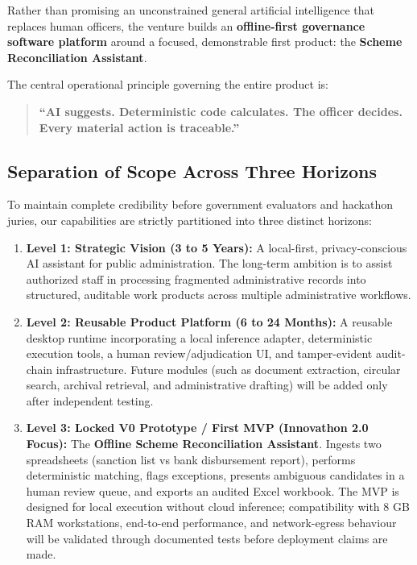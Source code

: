 \documentclass[11pt,a4paper]{article}
\begin{document}
Rather than promising an unconstrained general artificial intelligence that replaces human officers, the venture builds an \textbf{offline-first governance software platform} around a focused, demonstrable first product: the \textbf{Scheme Reconciliation Assistant}.

The central operational principle governing the entire product is:
\begin{quote}
    \textbf{“AI suggests. Deterministic code calculates. The officer decides. Every material action is traceable.”}
\end{quote}

\subsection{Separation of Scope Across Three Horizons}
To maintain complete credibility before government evaluators and hackathon juries, our capabilities are strictly partitioned into three distinct horizons:
\begin{enumerate}
    \item \textbf{Level 1: Strategic Vision (3 to 5 Years):} A local-first, privacy-conscious AI assistant for public administration. The long-term ambition is to assist authorized staff in processing fragmented administrative records into structured, auditable work products across multiple administrative workflows.
    \item \textbf{Level 2: Reusable Product Platform (6 to 24 Months):} A reusable desktop runtime incorporating a local inference adapter, deterministic execution tools, a human review/adjudication UI, and tamper-evident audit-chain infrastructure. Future modules (such as document extraction, circular search, archival retrieval, and administrative drafting) will be added only after independent testing.
    \item \textbf{Level 3: Locked V0 Prototype / First MVP (Innovathon 2.0 Focus):} The \textbf{Offline Scheme Reconciliation Assistant}. Ingests two spreadsheets (sanction list vs bank disbursement report), performs deterministic matching, flags exceptions, presents ambiguous candidates in a human review queue, and exports an audited Excel workbook. The MVP is designed for local execution without cloud inference; compatibility with 8 GB RAM workstations, end-to-end performance, and network-egress behaviour will be validated through documented tests before deployment claims are made.
\end{enumerate}
\end{document}
